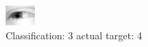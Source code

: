 \begin{figure}[h!]
\begin{center}
\includegraphics[width=0.60\columnwidth]{figures/ID2469_class_3_target_4.png}
\end{center}
\caption{ Classification: 3 actual target: 4}
\label{fig:ID2469_class_3_target_4}
\end{figure}
